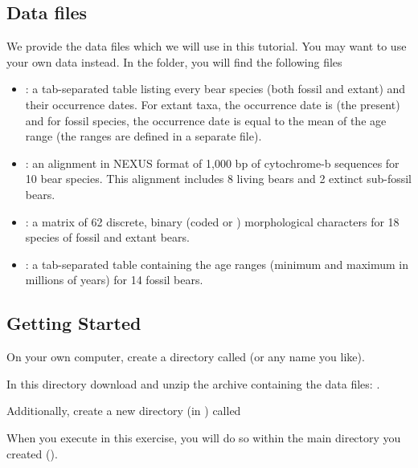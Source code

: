\subsection{Data files}\label{subsect:RB-DataFiles}

We provide the data files which we will use in this tutorial.
You may want to use your own data instead.
In the  folder, you will find the following files
\begin{itemize}[noitemsep,topsep=0pt]
\item {}: a tab-separated table listing every bear species (both fossil and extant) and their occurrence dates. For extant taxa, the occurrence date is  (\IE the present) and for fossil species, the occurrence date is equal to the mean of the age range (the ranges are defined in a separate file).
\item {}: an alignment in NEXUS format of 1,000 bp of cytochrome-b sequences for 10 bear species. This alignment includes 8 living bears and 2 extinct sub-fossil bears.
\item {}: a matrix of 62 discrete, binary (coded  or ) morphological characters for 18 species of fossil and extant bears.
\item {}: a tab-separated table containing the age ranges (minimum and maximum in millions of years) for 14 fossil bears.
\end{itemize}


\bigskip
\subsection{Getting Started}\label{subsect:RB-GetStart}

{\begin{framed}
On your own computer, create a directory called {\textcolor{red}{}} (or any name you like). 

In this directory download and unzip the archive containing the data files: \href{www.revbayes.com}{}.

Additionally, create a new directory (in ) called {\textcolor{red}{}}
\end{framed}}

When you execute \RevBayes in this exercise, you will do so within the main directory you created ().

